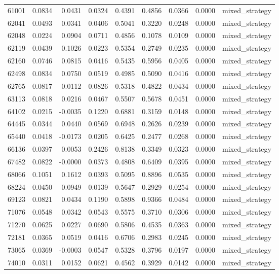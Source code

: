 \begin{tabular}{lrrrrrrrl}
61001 & 0.0834 & 0.0431 & 0.0324 & 0.4391 & 0.4856 & 0.0366 & 0.0000 & mixed_strategy \\
62041 & 0.0493 & 0.0341 & 0.0406 & 0.5041 & 0.3220 & 0.0248 & 0.0000 & mixed_strategy \\
62048 & 0.0224 & 0.0904 & 0.0711 & 0.4856 & 0.1078 & 0.0109 & 0.0000 & mixed_strategy \\
62119 & 0.0439 & 0.1026 & 0.0223 & 0.5354 & 0.2749 & 0.0235 & 0.0000 & mixed_strategy \\
62160 & 0.0746 & 0.0815 & 0.0416 & 0.5435 & 0.5956 & 0.0405 & 0.0000 & mixed_strategy \\
62498 & 0.0834 & 0.0750 & 0.0519 & 0.4985 & 0.5090 & 0.0416 & 0.0000 & mixed_strategy \\
62765 & 0.0817 & 0.0112 & 0.0826 & 0.5318 & 0.4822 & 0.0434 & 0.0000 & mixed_strategy \\
63113 & 0.0818 & 0.0216 & 0.0467 & 0.5507 & 0.5678 & 0.0451 & 0.0000 & mixed_strategy \\
64102 & 0.0215 & -0.0035 & 0.1220 & 0.6881 & 0.3159 & 0.0148 & 0.0000 & mixed_strategy \\
64445 & 0.0344 & 0.0440 & 0.0569 & 0.6948 & 0.2626 & 0.0239 & 0.0000 & mixed_strategy \\
65440 & 0.0418 & -0.0173 & 0.0205 & 0.6425 & 0.2477 & 0.0268 & 0.0000 & mixed_strategy \\
66136 & 0.0397 & 0.0053 & 0.2426 & 0.8138 & 0.3349 & 0.0323 & 0.0000 & mixed_strategy \\
67482 & 0.0822 & -0.0000 & 0.0373 & 0.4808 & 0.6409 & 0.0395 & 0.0000 & mixed_strategy \\
68066 & 0.1051 & 0.1612 & 0.0393 & 0.5095 & 0.8896 & 0.0535 & 0.0000 & mixed_strategy \\
68224 & 0.0450 & 0.0949 & 0.0139 & 0.5647 & 0.2929 & 0.0254 & 0.0000 & mixed_strategy \\
69123 & 0.0821 & 0.0434 & 0.1190 & 0.5898 & 0.9366 & 0.0484 & 0.0000 & mixed_strategy \\
71076 & 0.0548 & 0.0342 & 0.0543 & 0.5575 & 0.3710 & 0.0306 & 0.0000 & mixed_strategy \\
71270 & 0.0625 & 0.0227 & 0.0690 & 0.5806 & 0.4535 & 0.0363 & 0.0000 & mixed_strategy \\
72181 & 0.0365 & 0.0519 & 0.0416 & 0.6706 & 0.2983 & 0.0245 & 0.0000 & mixed_strategy \\
73065 & 0.0369 & -0.0003 & 0.0547 & 0.5328 & 0.3796 & 0.0197 & 0.0000 & mixed_strategy \\
74010 & 0.0311 & 0.0152 & 0.0621 & 0.4562 & 0.3929 & 0.0142 & 0.0000 & mixed_strategy \\

\end{tabular}
